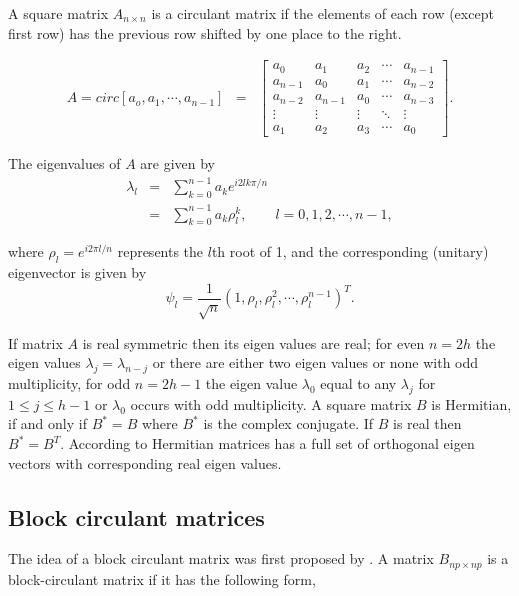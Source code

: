 A square matrix $A_{n\times n}$ is a circulant matrix if the elements of each row (except first row) has the previous row shifted by one place to the right.

\begin{eqnarray}
	A = circ[a_o, a_1,\cdots,a_{n-1}] &=& \left[
		\begin{array}{lllll}
			a_0     & a_1     & a_2    & \cdots & a_{n-1} \\
			a_{n-1} & a_0     & a_1    & \cdots & a_{n-2} \\
			a_{n-2} & a_{n-1} & a_0    & \cdots & a_{n-3} \\
			\vdots  & \vdots  & \vdots & \ddots & \vdots  \\
			a_1     & a_2     & a_3    & \cdots & a_0     
		\end{array}
	\right].
\end{eqnarray}

The eigenvalues of $A$ are given by
\begin{eqnarray*}
	\lambda_l & = & \sum_{k=0}^{n-1} a_k e^{i2lk\pi/n} \\
	& = & \sum_{k=0}^{n-1}a_k \rho_l^k, \quad \quad l = 0, 1, 2, \cdots, n-1,
\end{eqnarray*}

where $\rho_l = e^{i2\pi l/n}$ represents the $l$th root of 1, and the corresponding (unitary) eigenvector is given by
\[
	\psi_l = \frac{1}{\sqrt{n}}(1, \rho_l, \rho_l^2, \cdots, \rho_l^{n-1})^T.
\]

If matrix $A$ is real symmetric then its eigen values are real; for even $n=2h$ the eigen values $\lambda_j = \lambda_{n-j}$ or there are either two eigen values or none with odd multiplicity, for odd $n=2h-1$ the eigen value $\lambda_0$ equal to any $\lambda_j$ for $1\le j \le h-1$ or $\lambda_0$ occurs with odd multiplicity. A square matrix $B$ is Hermitian, if and only if $B^* = B$ where $B^*$ is the complex conjugate. If $B$ is real then $B^* = B^T$. According to \cite{Tee2005} Hermitian matrices has a full set of orthogonal eigen vectors with corresponding real eigen values.    



\subsection{Block circulant matrices}

The idea of a block circulant matrix was first proposed by \cite{Muir1920}. A matrix $B_{np\times np}$ is a block-circulant matrix if it has the following form,


